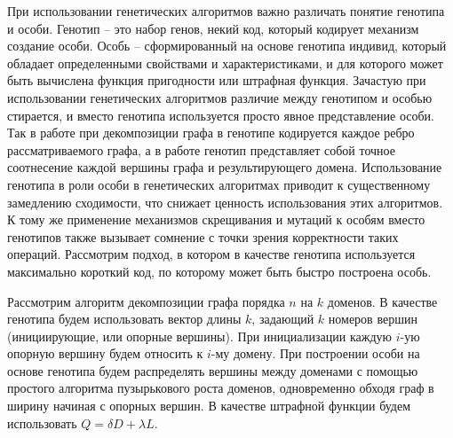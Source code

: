 При использовании генетических алгоритмов важно различать понятие генотипа и особи.
Генотип -- это набор генов, некий код, который кодирует механизм создание особи.
Особь -- сформированный на основе генотипа индивид, который обладает определенными свойствами и характеристиками, и для которого может быть вычислена функция пригодности или штрафная функция.
Зачастую при использовании генетических алгоритмов различие между генотипом и особью стирается, и вместо генотипа используется просто явное представление особи.
Так в работе \cite{Chaouche2023Graph} при декомпозиции графа в генотипе кодируется каждое ребро рассматриваемого графа, а в работе \cite{Li2020Graph} генотип представляет собой точное соотнесение каждой вершины графа и результирующего домена.
Использование генотипа в роли особи в генетических алгоритмах приводит к существенному замедлению сходимости, что снижает ценность использования этих алгоритмов.
К тому же применение механизмов скрещивания и мутаций к особям вместо генотипов также вызывает сомнение с точки зрения корректности таких операций.
Рассмотрим подход, в котором в качестве генотипа используется максимально короткий код, по которому может быть быстро построена особь.

Рассмотрим алгоритм декомпозиции графа порядка $n$ на $k$ доменов.
В качестве генотипа будем использовать вектор длины $k$, задающий $k$ номеров вершин (инициирующие, или опорные вершины).
При инициализации каждую $i$-ую опорную вершину будем относить к $i$-му домену.
При построении особи на основе генотипа будем распределять вершины между доменами с помощью простого алгоритма пузырькового роста доменов, одновременно обходя граф в ширину начиная с опорных вершин.
В качестве штрафной функции будем использовать $Q = \delta D + \lambda L$.

%
%
%

